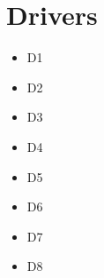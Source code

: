 \section{Drivers}

\begin{itemize}
	\item D1 \label{D1}
	\item D2 \label{D2}
	\item D3 \label{D3}
	\item D4 \label{D4}
	\item D5 \label{D5}
	\item D6 \label{D6}
	\item D7 \label{D7}
	\item D8 \label{D8}
\end{itemize}